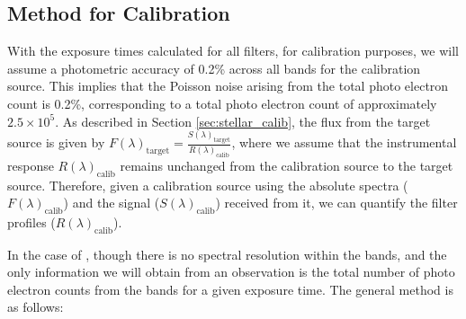 \subsection{Method for Calibration}\label{cal_meth}

With the exposure times calculated for all filters, for calibration purposes, we will assume a photometric accuracy of 0.2\% across all bands for the calibration source. This implies that the Poisson noise arising from the total photo electron count is 0.2\%, corresponding to a total photo electron count of approximately $2.5 \times 10^{5}$. As described in Section \ref{sec:stellar_calib}, the flux from the target source is given by $F(\lambda)_{\text{target}}=\frac{S(\lambda)_{\text{target}}}{R(\lambda)_{\text{calib}}}$, where we assume that the instrumental response $R(\lambda)_{\text{calib}}$ remains unchanged from the calibration source to the target source. Therefore, given a calibration source using the absolute spectra ($F(\lambda)_{\text{calib}}$) and the signal ($S(\lambda)_{\text{calib}}$) received from it, we can quantify the filter profiles ($R(\lambda)_{\text{calib}}$).

In the case of \suit, though there is no spectral resolution within the bands, and the only information we will obtain from an observation is the total number of photo electron counts from the bands for a given exposure time. The general method is as follows:

